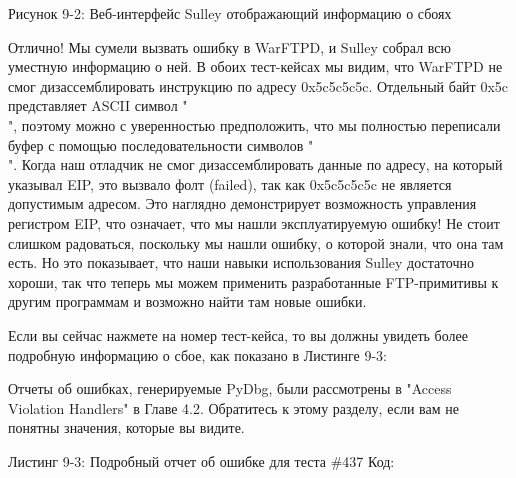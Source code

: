 \documentclass[12pt]{book}
\begin{document}
Рисунок 9-2: Веб-интерфейс Sulley отображающий информацию о сбоях

Отлично! Мы сумели вызвать ошибку в WarFTPD, и Sulley собрал всю уместную информацию о ней. В обоих тест-кейсах мы видим, что WarFTPD не смог дизассемблировать инструкцию по адресу 0x5c5c5c5c. Отдельный байт 0x5c представляет ASCII символ "\\", поэтому можно с уверенностью предположить, что мы полностью переписали буфер с помощью последовательности символов "\\". Когда наш отладчик не смог дизассемблировать данные по адресу, на который указывал EIP, это вызвало фолт (failed), так как 0x5c5c5c5c не является допустимым адресом. Это наглядно демонстрирует возможность управления регистром EIP, что означает, что мы нашли эксплуатируемую ошибку! Не стоит слишком радоваться, поскольку мы нашли ошибку, о которой знали, что она там есть. Но это показывает, что наши навыки использования Sulley достаточно хороши, так что теперь мы можем применить разработанные FTP-примитивы к другим программам и возможно найти там новые ошибки. 

Если вы сейчас нажмете на номер тест-кейса, то вы должны увидеть более подробную информацию о сбое, как показано в Листинге 9-3:

Отчеты об ошибках, генерируемые PyDbg, были рассмотрены в "Access Violation Handlers" в Главе 4.2. Обратитесь к этому разделу, если вам не понятны значения, которые вы видите.

Листинг 9-3: Подробный отчет об ошибке для теста \#437
Код:

\end{document}

